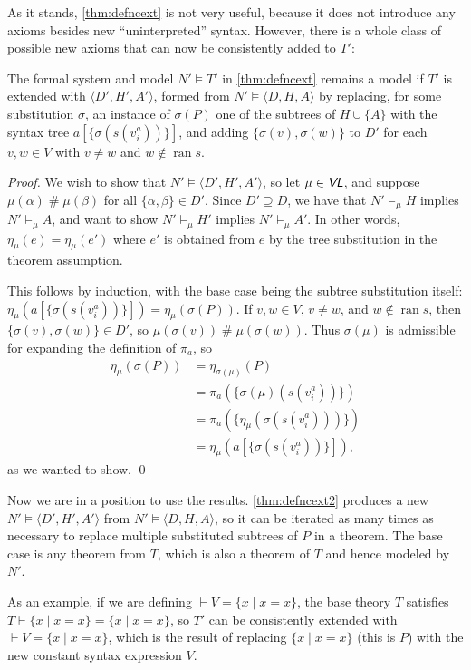 \documentclass[runningheads,a4paper]{llncs}
\newcommand{\vl}{\textit{\textsf{VL}}} %
\newcommand{\ang}[1]{\langle#1\rangle}
\newcommand{\fresh}{\mathbin{\#}}
\DeclareMathOperator{\ran}{ran}
\begin{document}
As it stands, \autoref{thm:defncext} is not very useful, because it does not introduce any axioms besides new ``uninterpreted'' syntax. However, there is a whole class of possible new axioms that can now be consistently added to $T'$:

\begin{theorem}\label{thm:defncext2}
The formal system and model $N'\models T'$ in \autoref{thm:defncext} remains a model if $T'$ is extended with $\ang{D',H',A'}$, formed from $N'\models\ang{D,H,A}$ by replacing, for some substitution $\sigma$, an instance of $\sigma(P)$ one of the subtrees of $H\cup\{A\}$ with the syntax tree $a[\{\sigma(s(v^a_i))\}]$, and adding $\{\sigma(v),\sigma(w)\}$ to $D'$ for each $v,w\in V$ with $v\ne w$ and $w\notin\ran s$.
\end{theorem}
\begin{proof}
We wish to show that $N'\models\ang{D',H',A'}$, so let $\mu\in\vl$, and suppose $\mu(\alpha)\fresh\mu(\beta)$ for all $\{\alpha,\beta\}\in D'$. Since $D'\supseteq D$, we have that $N'\models_\mu H$ implies  $N'\models_\mu A$, and want to show $N'\models_\mu H'$ implies  $N'\models_\mu A'$. In other words, $\eta_\mu(e)=\eta_\mu(e')$ where $e'$ is obtained from $e$ by the tree substitution in the theorem assumption.

This follows by induction, with the base case being the subtree substitution itself: $\eta_\mu(a[\{\sigma(s(v^a_i))\}])=\eta_\mu(\sigma(P))$. If $v,w\in V$, $v\ne w$, and $w\notin\ran s$, then $\{\sigma(v),\sigma(w)\}\in D'$, so $\mu(\sigma(v))\fresh\mu(\sigma(w))$. Thus $\sigma(\mu)$ is admissible for expanding the definition of $\pi_a$, so
\begin{align*}
\eta_\mu(\sigma(P))&=\eta_{\sigma(\mu)}(P)\\
&=\pi_a(\{\sigma(\mu)(s(v^a_i))\})\\
&=\pi_a(\{\eta_\mu(\sigma(s(v^a_i)))\})\\
&=\eta_\mu(a[\{\sigma(s(v^a_i))\}]),
\end{align*}
as we wanted to show.
\qed\end{proof}

Now we are in a position to use the results. \autoref{thm:defncext2} produces a new $N'\models\ang{D',H',A'}$ from $N'\models\ang{D,H,A}$, so it can be iterated as many times as necessary to replace multiple substituted subtrees of $P$ in a theorem. The base case is any theorem from $T$, which is also a theorem of $T$ and hence modeled by $N'$.

As an example, if we are defining $\vdash V=\{x\mid x=x\}$, the base theory $T$ satisfies $T\vdash\{x\mid x=x\}=\{x\mid x=x\}$, so $T'$ can be consistently extended with $\vdash V=\{x\mid x=x\}$, which is the result of replacing $\{x\mid x=x\}$ (this is $P$) with the new constant syntax expression $V$.
\end{document}
